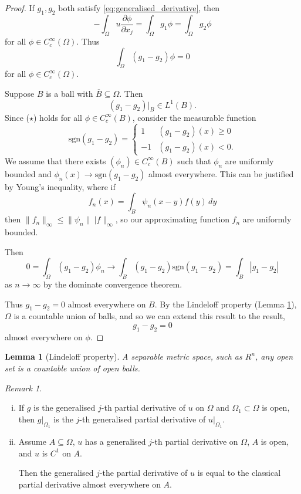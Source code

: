 \documentclass[10pt, oneside, reqno]{amsart}
\theoremstyle{plain}%
\newtheorem{lem}[thm]{Lemma}
\numberwithin{equation}{section}
\theoremstyle{definition}
\theoremstyle{remark}
\newtheorem*{rem}{Remark}
\begin{document}
\begin{proof}
	If $g_1, g_2$ both satisfy \eqref{eq:generalised_derivative}, then \[
		-\int_\Omega u \frac{\partial \phi}{\partial x_j} = \int_\Omega g_1 \phi = \int_\Omega g_2 \phi
	\] for all $\phi \in C_c^\infty(\Omega)$.  Thus \[
		\int_\Omega (g_1 - g_2) \phi = 0
		\tag{$\star$}
	\] for all $\phi \in C_c^\infty(\Omega)$.
	
	Suppose $B$ is a ball with $\overline B \subseteq \Omega$.  Then \[
		(g_1 - g_2) |_B \in L^1(B).  
	\]   Since ($\star$) holds for all $\phi \in C_c^\infty(B)$, consider the measurable function \[
		\text{sgn}(g_1 - g_2) = \begin{cases}
			1 & (g_1 - g_2)(x) \geq 0 \\
			-1 & (g_1 - g_2)(x) < 0.
		\end{cases}  
	\]  
	We assume that there exists $(\phi_n) \in C_c^\infty(B)$ such that $\phi_n$ are uniformly bounded and $\phi_n(x) \rightarrow \text{sgn}(g_1 - g_2)$ almost everywhere.  This can be justified by Young's inequality, where if \[
		f_n(x) = \int_B \psi_n(x-y) f(y) \, dy
	\] then $\| f_n \|_\infty \leq \| \psi_n \| \ | f \|_\infty$, so our approximating function $f_n$ are uniformly bounded.
	
	Then \[
		0 = \int_\Omega (g_1 - g_2) \phi_n \rightarrow \int_B (g_1 - g_2) \text{sgn}(g_1 - g_2) = \int_B |g_1 - g_2 |
	\] as $n \rightarrow \infty$ by the dominate convergence theorem. 
	
	Thus $g_1 - g_2 = 0$ almost everywhere on $B$.  By the Lindeloff property (Lemma \ref{lem:lindeloff}), $\Omega$ is a countable union of balls, and so we can extend this result to the result, \[
		g_1 - g_2 = 0
	\] almost everywhere on $\phi$.  
\end{proof}

\begin{lem}[Lindeloff property]
	\label{lem:lindeloff}
	A separable metric space, such as $R^n$, any open set is a countable union of open balls.
\end{lem} 

\begin{rem}{\ }
	\begin{enumerate}[(i)]
		\item If $g$ is the generalised $j$-th partial derivative of $u$ on $\Omega$ and $\Omega_1 \subset \Omega$ is open, then $g |_{\Omega_1}$ is the $j$-th generalised partial derivative of $u|_{\Omega_1}$.
		\item Assume $A \subseteq \Omega$, $u$ has a generalised $j$-th partial derivative on $\Omega$, $A$ is open, and $u$ is $C^1$ on $A$. 
		
		Then the generalised $j$-the partial derivative of $u$ is equal to the classical partial derivative almost everywhere on $A$.
	\end{enumerate}
\end{rem} 
\end{document}
